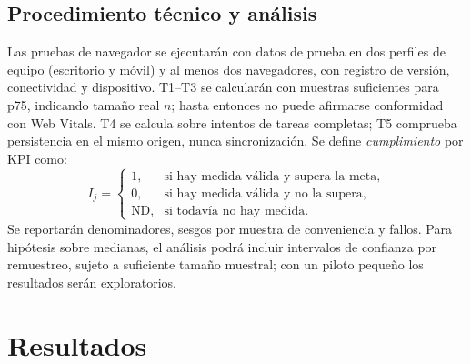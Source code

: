 \documentclass[conference,10pt]{IEEEtran}
\begin{document}
\subsection{Procedimiento técnico y análisis}
Las pruebas de navegador se ejecutarán con datos de prueba en dos perfiles de equipo (escritorio y móvil) y al menos dos navegadores, con registro de versión, conectividad y dispositivo. T1--T3 se calcularán con muestras suficientes para p75, indicando tamaño real $n$; hasta entonces no puede afirmarse conformidad con Web Vitals. T4 se calcula sobre intentos de tareas completas; T5 comprueba persistencia en el mismo origen, nunca sincronización. Se define \emph{cumplimiento} por KPI como:
\begin{equation}
I_j=\begin{cases}1,&\text{si hay medida válida y supera la meta},\\0,&\text{si hay medida válida y no la supera},\\\text{ND},&\text{si todavía no hay medida.}\end{cases}
\end{equation}
Se reportarán denominadores, sesgos por muestra de conveniencia y fallos. Para hipótesis sobre medianas, el análisis podrá incluir intervalos de confianza por remuestreo, sujeto a suficiente tamaño muestral; con un piloto pequeño los resultados serán exploratorios.

\section{Resultados}
\end{document}
